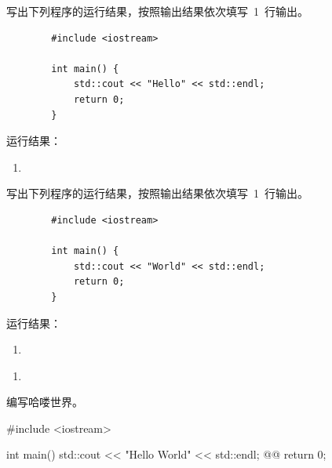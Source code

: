 \documentclass[answer,sheet]{cuzexam} %
\begin{document}
\begin{studentanswer}
    \vspace{28ex}
\end{studentanswer}


\begin{problem}
    写出下列程序的运行结果，按照输出结果依次填写~1~行输出。
    \begin{verbatim}
        #include <iostream>
        
        int main() {
            std::cout << "Hello" << std::endl;
            return 0;
        }
    \end{verbatim}
    运行结果：
    \begin{enumerate}[label=(\arabic*),series=cuzafter]
        \item {}
    \end{enumerate}
\end{problem}

\begin{problem}
    写出下列程序的运行结果，按照输出结果依次填写~1~行输出。
    \begin{verbatim}
        #include <iostream>
        
        int main() {
            std::cout << "World" << std::endl;
            return 0;
        }
    \end{verbatim}
    运行结果：
    \begin{enumerate}[label=(\arabic*),resume=cuzafter]
        \item {}
    \end{enumerate}
\end{problem}

\begin{sheetcontents}
    \begin{enumerate}[label=(\arabic*)]
        \item {}
    \end{enumerate}
\end{sheetcontents}


\begin{problem}
    编写哈喽世界。
\end{problem}

\begin{solution}
    \begin{cppcode}
        #include <iostream> 
        
        int main() {
            std::cout << "Hello World" << std::endl; @@
            return 0;
        }
    \end{cppcode}
\end{solution}
\end{document}
